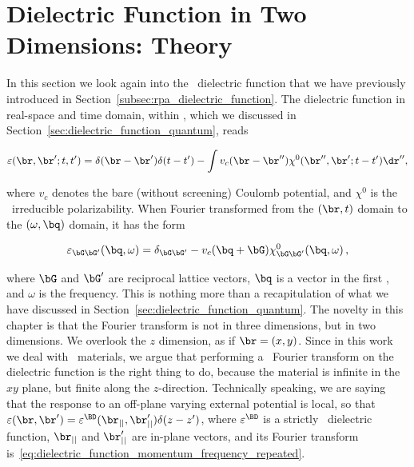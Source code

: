 \section{Dielectric Function in Two Dimensions: Theory}
\label{sec:dielectric_function_revisited}


In this section we look again into the \rpa~dielectric function that we have previously introduced in Section~\ref{subsec:rpa_dielectric_function}.
The dielectric function in real-space and time domain, within \rpa, which we discussed in Section~\ref{sec:dielectric_function_quantum}, reads

\begin{equation}
\label{eq:dielectric_function_real_time_recalled}
    \varepsilon (\br,\br';t,t') = \delta(\br - \br') \delta(t-t') - \int  v_c(\br - \br'') \chi^0 (\br'',\br';t-t') \dr'' ,
\end{equation}

\noindent where $v_c$ denotes the bare (without screening) Coulomb potential, and $\chi^0$ is the \rpa~irreducible polarizability.
When Fourier transformed from the $(\br,t)$ domain to the $(\omega,\bq)$ domain, it has the form

\begin{equation}
    \label{eq:dielectric_function_momentum_frequency_repeated}
    \varepsilon_{\bG \bG'} (\bq,\omega) = \delta_{\bG \bG'} - v_c(\bq + \bG) \chi^0_{\bG \bG'} (\bq,\omega) \,,
\end{equation}

\noindent where $\bG$ and $\bG'$ are reciprocal lattice vectors, $\bq$ is a vector in the first \bz, and $\omega$ is the frequency.
This is nothing more than a recapitulation of what we have discussed in Section~\ref{sec:dielectric_function_quantum}.
The novelty in this chapter is that the Fourier transform is not in three dimensions, but in two dimensions.
We overlook the $z$ dimension, as if $\br=(x,y)$.
Since in this work we deal with \bd~materials, we argue that performing a \bd~Fourier transform on the dielectric function is the right thing to do, because the material is infinite in the $xy$ plane, but finite along the $z$-direction.
Technically speaking, we are saying that the response to an off-plane varying external potential is local, so that $\varepsilon(\br,\br') = \varepsilon^{\BD}(\br_{||},\br_{||}') \delta(z-z')$, where $\varepsilon^{\BD}$ is a strictly \bd~dielectric function, $\br_{||}$ and $\br_{||}'$ are in-plane vectors, and its Fourier transform is~\eqref{eq:dielectric_function_momentum_frequency_repeated}.

